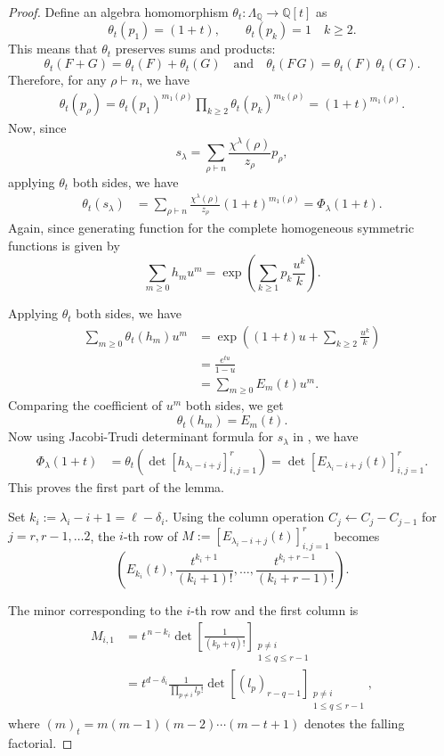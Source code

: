 \documentclass[12pt]{article}
\theoremstyle{definition}
\newcommand{\Q}{\mathbb Q}
\newcommand{\1}{\mathbf 1}
\begin{document}
\begin{proof}

Define an algebra homomorphism $\theta_t:\Lambda_\Q\to \Q[t]$ as
$$\theta_t(p_1)=(1+t),\qquad \theta_t(p_k)=1\quad k\geq 2.$$
This means that $\theta_t$ preserves sums and products:
$$\theta_t(F+G)=\theta_t(F)+\theta_t(G)\quad \text{and}\quad \theta_t(F\,G)=\theta_t(F)\,\theta_t(G).$$
Therefore, for any $\rho\vdash n$, we have 
\begin{align*}
     \theta_t(p_\rho) = \theta_t(p_1)^{m_1(\rho)} \prod_{k \ge 2} \theta_t(p_k)^{m_k(\rho)} = (1+t)^{m_1(\rho)}.
\end{align*}
Now, since $$s_{\lambda}=\sum\limits_{\rho\vdash n}\frac{\chi^{\lambda}(\rho)}{z_{\rho}}p_{\rho},$$
applying $\theta_t$ both sides, we have
\begin{align}
\theta_t(s_{\lambda})
    &=\sum_{\rho\vdash n}\frac{\chi^{\lambda}(\rho)}{z_{\rho}}(1+t)^{m_1(\rho)}=\Phi_{\lambda}(1+t).\label{eqn:theta_t_schur}
\end{align}
Again, since generating function for the complete homogeneous symmetric functions is given by
$$\sum_{m\geq 0}h_mu^m=\exp\left(\sum_{k\geq 1}p_k \frac{u^k}{k}\right).$$

Applying $\theta_t$ both sides, we have
\begin{align*}
    \sum_{m\geq 0}\theta_t(h_m)u^m&=\exp\left((1+t)u+\sum_{k\geq 2}\frac{u^k}{k}\right)\\
    &=\frac{e^{tu}}{1-u}\\
    &=\sum_{m\geq 0}E_m(t)u^m.
\end{align*}
Comparing the coefficient of $u^m$ both sides, we get 
$$\theta_t(h_m)=E_m(t).$$
Now using Jacobi-Trudi determinant formula for $s_{\lambda}$ in , we have   
\begin{align}
    \Phi_{\lambda}(1+t)
    &=\theta_t(\det\left[h_{\lambda_i -i+j}\right]_{i,j=1}^{r})=\det\left[E_{\lambda_i -i+j}(t)\right]_{i,j=1}^{r}.\nonumber
\end{align}
This proves the first part of the lemma. 

Set $k_i:=\lambda_i-i+1=\ell-\delta_i$. Using the column operation $C_j\longleftarrow C_j-C_{j-1}$ for $j=r,r-1,\ldots 2$, the $i$-th row of $M:=\left[E_{\lambda_i -i+j}(t)\right]_{i,j=1}^{r}$ becomes
$$
\left(
E_{k_i}(t),
\frac{t^{k_i+1}}{(k_i+1)!},
\ldots,
\frac{t^{k_i+r-1}}{(k_i+r-1)!}
\right).
$$

The minor corresponding to the $i$-th row and the first column is
\begin{align*}
    M_{i,1}&=t^{\,n-k_i}
\det
\left[
\frac{1}{(k_p+q)!}
\right]_{\substack{p\neq i\\1\leq q\leq r-1}}\\
&=t^{d-\delta_i}\frac{1}{\prod_{p\neq i}l_p!}\det [(l_p)_{r-q-1}]_{\substack{p\neq i\\1\leq q\leq r-1}},
\end{align*}
where $(m)_t=m(m-1)(m-2)\cdots(m-t+1)$ denotes the falling factorial.


\end{proof}
\end{document}
